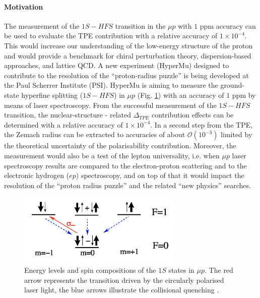 \documentclass[12pt]{article}
\begin{document}
\paragraph{Motivation}
The measurement of the $1S-HFS$ transition in the $\mu{p}$ with $1$ ppm accuracy can be used to evaluate the TPE contribution with a relative accuracy of $1 \times 10^{-4}$. This would increase our understanding of the low-energy structure of the proton and would provide a benchmark for chiral perturbation theory, dispersion-based approaches, and lattice QCD. A new experiment (HyperMu) designed to contribute to the resolution of the ``proton-radius puzzle'' is being developed at the Paul Scherrer Institute (PSI). HyperMu is aiming to measure the ground-state hyperfine splitting ($1S - HFS$) in $\mu{p}$ (Fig. \ref{fig:sublevels}) with an accuracy of $1$ ppm by means of laser spectroscopy. From the successful measurement of the $1S-HFS$ transition, the nuclear-structure - related ${\Delta}_{TPE}$ contribution effects can be determined with a relative accuracy of $1 \times 10^{-4}$. In a second step from the TPE, the Zemach radius can be extracted to accuracies of about $\mathcal{O}(10^{-3})$ limited by the theoretical uncertainty of the polarisability contribution. Moreover, the measurement would also be a test of the lepton universality, i.e. when $\mu{p}$ laser spectroscopy results are compared to the electron-proton scattering and to the electronic hydrogen ($ep$) spectroscopy, and on top of that it would impact the resolution of the ``proton radius puzzle'' and the related ``new physics'' searches. 
\begin{figure}[h]
\centering
\includegraphics[width=0.7\textwidth]{img/sublevels}
\caption{Energy levels and spin compositions of the $1S$ states in $\mu{p}$. The red arrow represents the transition driven by the circularly polarised laser light, the blue arrows illustrate the collisional quenching \cite{proposal}.}
\label{fig:sublevels}
\end{figure}

\end{document}
